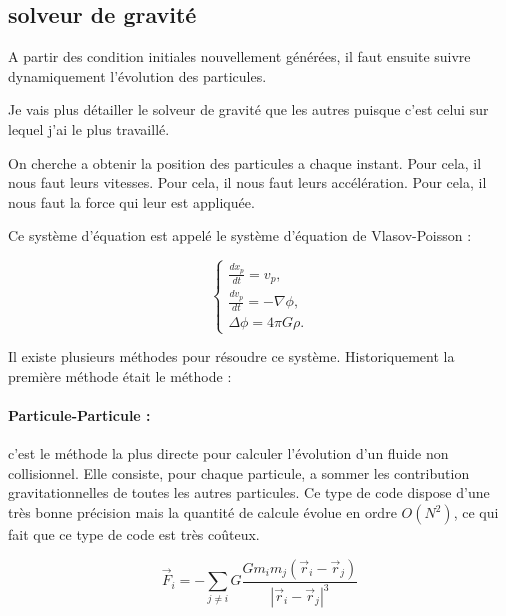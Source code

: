 \subsection{solveur de gravité}

A partir des condition initiales nouvellement générées, il faut ensuite suivre dynamiquement l'évolution des particules.

Je vais plus détailler le solveur de gravité que les autres puisque c'est celui sur lequel j'ai le plus travaillé.


On cherche a obtenir la position des particules a chaque instant.
Pour cela, il nous faut leurs vitesses.
Pour cela, il nous faut leurs accélération.
Pour cela, il nous faut la force qui leur est appliquée.

Ce système d'équation est appelé le système d'équation de Vlasov-Poisson :

\begin{equation}
\begin{cases}

\frac{d{x}_p}{dt} = { v}_p, \\
\frac{d{ v}_p}{dt} = -\nabla \phi , \\
\Delta \phi= 4\pi G \rho.

\end{cases}
\label{eq:Ncorps}
\end{equation}


Il existe plusieurs méthodes pour résoudre ce système.
Historiquement la première méthode était le méthode :

\paragraph{Particule-Particule : } c'est le méthode la plus directe pour calculer l'évolution d'un fluide non collisionnel. 
Elle consiste, pour chaque particule, a sommer les contribution gravitationnelles de toutes les autres particules.
Ce type de code dispose d'une très bonne précision mais la quantité de calcule évolue en ordre $O(N^2)$, ce qui fait que ce type de code est très coûteux.

\begin{equation}
\vec{F}_i=-\sum_{j\neq i} G \frac{G m_i m_j(\vec{r}_i - \vec{r}_j) }{ |\vec{r}_i - \vec{r}_j |^3}
\end{equation}

